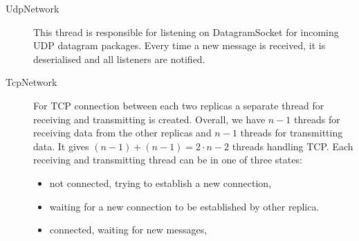 \begin{description}
  \item[UdpNetwork] \hfill

    This thread is responsible for listening on DatagramSocket for incoming UDP datagram packages. Every time a new message is received, it is deserialised and all listeners are notified.

  \item[TcpNetwork] \hfill

    For TCP connection between each two replicas a separate thread for receiving and transmitting is created. Overall, we have $n-1$ threads for receiving data from the other replicas and $n-1$ threads for transmitting data. It gives $(n - 1) + (n - 1) = 2 \cdot n - 2$ threads handling TCP. Each receiving and transmitting thread can be in one of three states:
    \begin{itemize}
            \item not connected, trying to establish a new connection,
            \item waiting for a new connection to be established by other replica.
            \item connected, waiting for new messages,
    \end{itemize}
\end{description}
